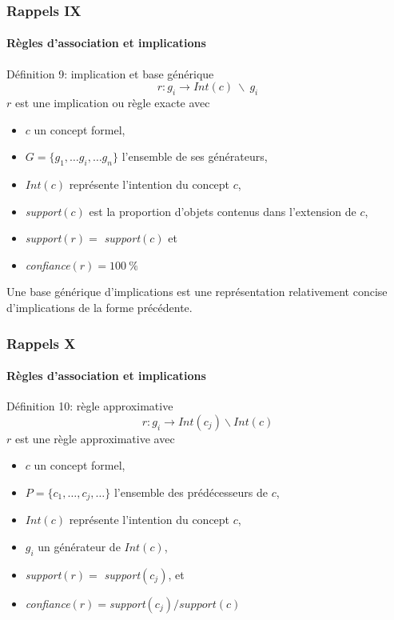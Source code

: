 \documentclass[french]{beamer}
\begin{document}
\begin{frame}
\frametitle{Rappels IX}
\framesubtitle{Règles d'association et implications}
\begin{block}{Définition 9: implication et base générique}
$$r: g_i \rightarrow Int(c)\ \backslash\ g_i $$
$r$ est une implication ou règle exacte avec
\begin{itemize}
\item $c$ un concept formel,
\item $G=\{g_1,\ldots g_i, \ldots g_n \}$ l'ensemble de ses générateurs,
\item $Int(c)$ représente l'intention du concept $c$,
\item \emph{support}$(c)$ est la proportion d'objets contenus dans l'extension de $c$,
\item \emph{support}$(r) = $ \emph{support}$(c)$ et
\item \emph{confiance}$(r) = 100\ \%$
\end{itemize}
Une base générique \parencite{Pasquier1999} d'implications est une représentation relativement concise d'implications de la forme précédente. 
\end{block}
\end{frame}

\begin{frame}
\frametitle{Rappels X}
\framesubtitle{Règles d'association et implications}
\begin{block}{Définition 10: règle approximative}
$$r: g_i \rightarrow Int(c_j)\backslash Int(c) $$
$r$ est une règle approximative avec
\begin{itemize}
\item $c$ un concept formel,
\item $P = \{c_1, \ldots, c_j, \ldots \}$ l'ensemble des prédécesseurs de $c$,
\item $Int(c)$ représente l'intention du concept $c$,
\item $g_i$ un générateur de $Int(c)$,
\item \emph{support}$(r) =$ \emph{support}$(c_j)$, et
\item  \emph{confiance}$(r) = $\emph{support}$(c_j)/support(c)$
\end{itemize}
\end{block}
\end{frame}
\end{document}
